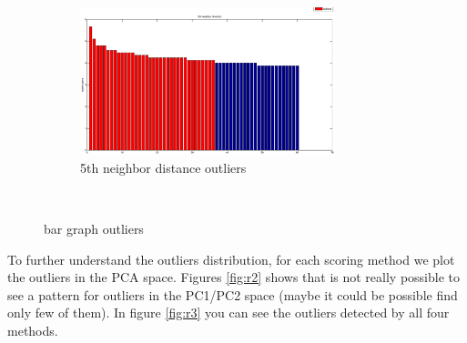 \begin{figure}[htbp]
                \qquad
	\begin{subfigure}[b]{0.46\textwidth}
                \includegraphics[width=7.4cm]{figures/04.eps}
                \caption{5th neighbor distance outliers}
         \end{subfigure} \\
        \caption{bar graph outliers}
         \label{fig:r1}
\end{figure}

To further understand the outliers distribution, for each scoring method we plot the outliers in the PCA space. Figures  \ref{fig:r2} shows that is not really possible to see a pattern for outliers in the PC1/PC2 space (maybe it could be possible find only few of them).
In figure \ref{fig:r3} you can see the outliers detected by all four methods.

